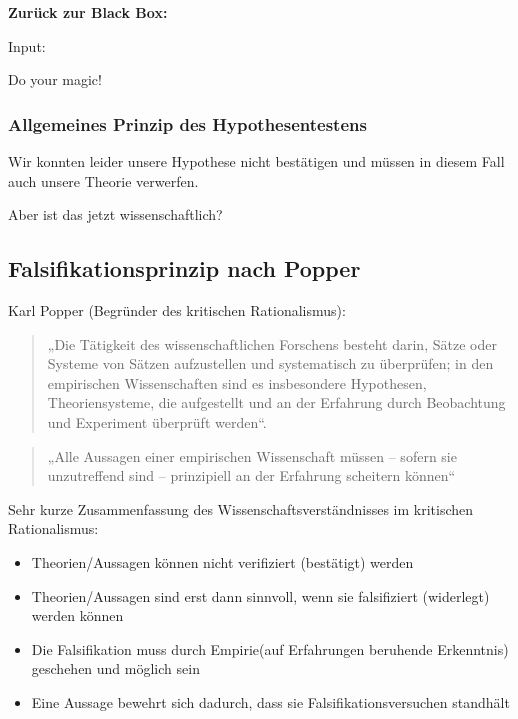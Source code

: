\documentclass[
]{book}
\begin{document}
\textbf{Zurück zur Black Box:}

Input:

\hypertarget{input2}{}

\hypertarget{blackux20box2}{}

Do your magic!

\hypertarget{allgemeines-prinzip-des-hypothesentestens}{%
\subsubsection{Allgemeines Prinzip des Hypothesentestens}\label{allgemeines-prinzip-des-hypothesentestens}}

Wir konnten leider unsere Hypothese nicht bestätigen und müssen in diesem Fall auch unsere Theorie verwerfen.

Aber ist das jetzt wissenschaftlich?

\hypertarget{falsifikationsprinzip-nach-popper}{%
\subsection{Falsifikationsprinzip nach Popper}\label{falsifikationsprinzip-nach-popper}}

Karl Popper (Begründer des kritischen Rationalismus):

\begin{quote}
„Die Tätigkeit des wissenschaftlichen Forschens besteht darin, Sätze oder Systeme von Sätzen aufzustellen und systematisch zu überprüfen; in den empirischen Wissenschaften sind es insbesondere Hypothesen, Theoriensysteme, die aufgestellt und an der Erfahrung durch Beobachtung und Experiment überprüft werden``.
\end{quote}

\begin{quote}
„Alle Aussagen einer empirischen Wissenschaft müssen -- sofern sie unzutreffend sind -- prinzipiell an der Erfahrung scheitern können``
\end{quote}

Sehr kurze Zusammenfassung des Wissenschaftsverständnisses im kritischen Rationalismus:

\begin{itemize}
\item
  Theorien/Aussagen können nicht verifiziert (bestätigt) werden
\item
  Theorien/Aussagen sind erst dann sinnvoll, wenn sie falsifiziert (widerlegt) werden können
\item
  Die Falsifikation muss durch Empirie(auf Erfahrungen beruhende Erkenntnis) geschehen und möglich sein
\item
  Eine Aussage bewehrt sich dadurch, dass sie Falsifikationsversuchen standhält
\end{itemize}
\end{document}
